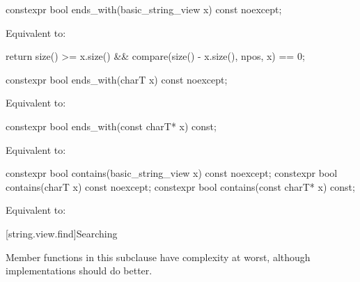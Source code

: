 %
\begin{itemdecl}
constexpr bool ends_with(basic_string_view x) const noexcept;
\end{itemdecl}

\begin{itemdescr}
\pnum
\effects
Equivalent to:
\begin{codeblock}
return size() >= x.size() && compare(size() - x.size(), npos, x) == 0;
\end{codeblock}
\end{itemdescr}

%
\begin{itemdecl}
constexpr bool ends_with(charT x) const noexcept;
\end{itemdecl}

\begin{itemdescr}
\pnum
\effects
Equivalent to: 
\end{itemdescr}

%
\begin{itemdecl}
constexpr bool ends_with(const charT* x) const;
\end{itemdecl}

\begin{itemdescr}
\pnum
\effects
Equivalent to: 
\end{itemdescr}

%
\begin{itemdecl}
constexpr bool contains(basic_string_view x) const noexcept;
constexpr bool contains(charT x) const noexcept;
constexpr bool contains(const charT* x) const;
\end{itemdecl}

\begin{itemdescr}
\pnum
\effects
Equivalent to: 
\end{itemdescr}

[string.view.find]{Searching}

\pnum
Member functions in this subclause have complexity  at worst,
although implementations should do better.

